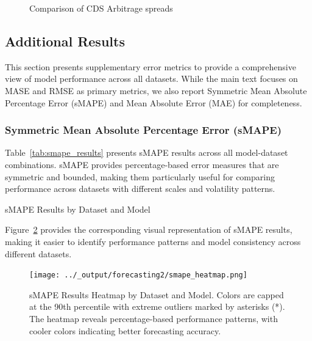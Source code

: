 \documentclass{article}
\begin{document}
\begin{appendices}
\begin{figure}
  \caption{Comparison of CDS Arbitrage spreads}
  \label{fig:CDS_replicate}
\end{figure}


\subsection{Additional Results}
\label{app:additional_results}

This section presents supplementary error metrics to provide a comprehensive view of model performance across all datasets. While the main text focuses on MASE and RMSE as primary metrics, we also report Symmetric Mean Absolute Percentage Error (sMAPE) and Mean Absolute Error (MAE) for completeness.

\subsubsection{Symmetric Mean Absolute Percentage Error (sMAPE)}

Table~\ref{tab:smape_results} presents sMAPE results across all model-dataset combinations. sMAPE provides percentage-based error measures that are symmetric and bounded, making them particularly useful for comparing performance across datasets with different scales and volatility patterns.

\begin{table}[htbp]
\centering
\caption{sMAPE Results by Dataset and Model}
\label{tab:smape_results}

\vspace{0.1cm}

\end{table}

Figure~\ref{fig:smape_heatmap} provides the corresponding visual representation of sMAPE results, making it easier to identify performance patterns and model consistency across different datasets.

\begin{figure}[htbp]
\centering
\texttt{[image: ../\_output/forecasting2/smape\_heatmap.png]}
\caption{sMAPE Results Heatmap by Dataset and Model. Colors are capped at the 90th percentile with extreme outliers marked by asterisks (*). The heatmap reveals percentage-based performance patterns, with cooler colors indicating better forecasting accuracy.}
\label{fig:smape_heatmap}
\end{figure}


\end{appendices}
\end{document}
